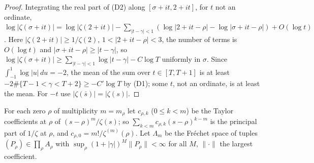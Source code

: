 \begin{proof}
Integrating the real part of (D2) along $[\sigma+it,2+it]$, for $t$ not an ordinate,
$\log|\zeta(\sigma+it)|=\log|\zeta(2+it)|-\sum_{|t-\gamma|<1}(\log|2+it-\rho|-\log|\sigma+it-\rho|)+O(\log t)$.
Here $|\zeta(2+it)|\ge1/\zeta(2)$, $1<|2+it-\rho|<3$, the number of terms is $O(\log t)$ and $|\sigma+it-\rho|\ge|t-\gamma|$, so $\log|\zeta(\sigma+it)|\ge\sum_{|t-\gamma|<1}\log|t-\gamma|-C\log T$ uniformly in $\sigma$.
Since $\int_{-1}^1\log|u|\,du=-2$, the mean of the sum over $t\in[T,T+1]$ is at least $-2\#\{T-1<\gamma<T+2\}\ge-C'\log T$ by (D1); some $t$, not an ordinate, is at least the mean. For $-t$ use $|\zeta(\bar s)|=|\zeta(s)|$.
\end{proof}

For each zero $\rho$ of multiplicity $m=m_\rho$ let $c_{\rho,k}$ ($0\le k<m$) be the Taylor coefficients at $\rho$ of $(s-\rho)^m/\zeta(s)$; so $\sum_{k<m}c_{\rho,k}(s-\rho)^{k-m}$ is the principal part of $1/\zeta$ at $\rho$, and $c_{\rho,0}=m!/\zeta^{(m)}(\rho)$.
Let $\Lambda_m$ be the Fréchet space of tuples $(P_\rho)\in\prod_\rho A_\rho$ with $\sup_\rho(1+|\gamma|)^M\|P_\rho\|<\infty$ for all $M$, $\|\cdot\|$ the largest coefficient.

